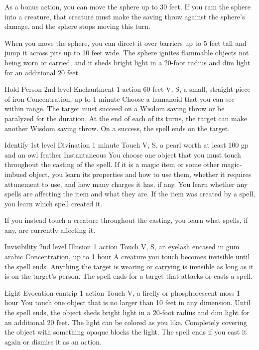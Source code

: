 \documentclass[10pt,a4paper,twoside,bg=print,twocolumn,openany,nodeprecatedcode]{dndbook}
\begin{document}
As a bonus action, you can move the sphere up to 30 feet. If you ram the sphere into a creature, that creature must make the saving throw against the sphere's damage, and the sphere stops moving this turn.

When you move the sphere, you can direct it over barriers up to 5 feet tall and jump it across pits up to 10 feet wide. The sphere ignites flammable objects not being worn or carried, and it sheds bright light in a 20-foot radius and dim light for an additional 20 feet.



\DndSpellHeader%
{Hold Person}
{2nd level Enchantment}
{1 action}
{60 feet}
{V, S, a small, straight piece of iron}
{Concentration, up to 1 minute}
Choose a humanoid that you can see within range. The target must succeed on a Wisdom saving throw or be paralyzed for the duration. At the end of each of its turns, the target can make another Wisdom saving throw. On a success, the spell ends on the target.



\DndSpellHeader%
{Identify}
{1st level Divination}
{1 minute}
{Touch}
{V, S, a pearl worth at least 100 gp and an owl feather}
{Instantaneous}
You choose one object that you must touch throughout the casting of the spell. If it is a magic item or some other magic-imbued object, you learn its properties and how to use them, whether it requires attunement to use, and how many charges it has, if any. You learn whether any spells are affecting the item and what they are. If the item was created by a spell, you learn which spell created it.

If you instead touch a creature throughout the casting, you learn what spells, if any, are currently affecting it.



\DndSpellHeader%
{Invisibility}
{2nd level Illusion}
{1 action}
{Touch}
{V, S, an eyelash encased in gum arabic}
{Concentration, up to 1 hour}
A creature you touch becomes invisible until the spell ends. Anything the target is wearing or carrying is invisible as long as it is on the target's person. The spell ends for a target that attacks or casts a spell.



\DndSpellHeader%
{Light}
{Evocation cantrip}
{1 action}
{Touch}
{V, a firefly or phosphorescent moss}
{1 hour}
You touch one object that is no larger than 10 feet in any dimension. Until the spell ends, the object sheds bright light in a 20-foot radius and dim light for an additional 20 feet. The light can be colored as you like. Completely covering the object with something opaque blocks the light. The spell ends if you cast it again or dismiss it as an action.
\end{document}
